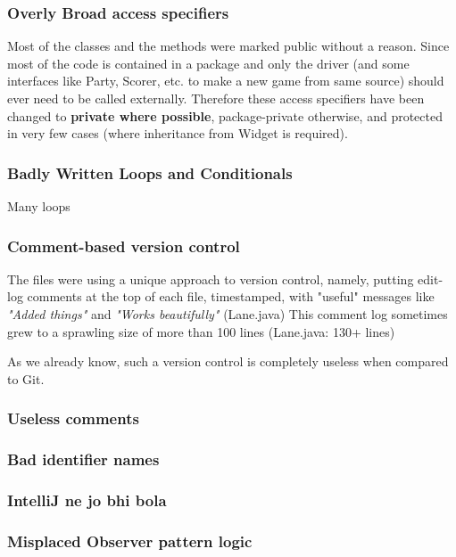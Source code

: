 \subsubsection{Overly Broad access specifiers}

Most of the classes and the methods were marked public without a reason. Since most of the code is contained in a package and only the driver (and some interfaces like Party, Scorer, etc. to make a new game from same source) should ever need to be called externally. Therefore these access specifiers have been changed to \textbf{private where possible}, package-private otherwise, and protected in very few cases (where inheritance from Widget is required).

\subsubsection{Badly Written Loops and Conditionals}

Many loops

\subsubsection{Comment-based version control}

The files were using a unique approach to version control, namely, putting edit-log comments at the top of each file, timestamped, with "useful" messages like \textit{"Added things"} and \textit{"Works beautifully"} (\textrm{Lane.java}) This comment log sometimes grew to a sprawling size of more than 100 lines (Lane.java: 130+ lines)

As we already know, such a version control is completely useless when compared to Git.

\subsubsection{Useless comments}


\subsubsection{Bad identifier names}


\subsubsection{IntelliJ ne jo bhi bola}


\subsubsection{Misplaced Observer pattern logic}
